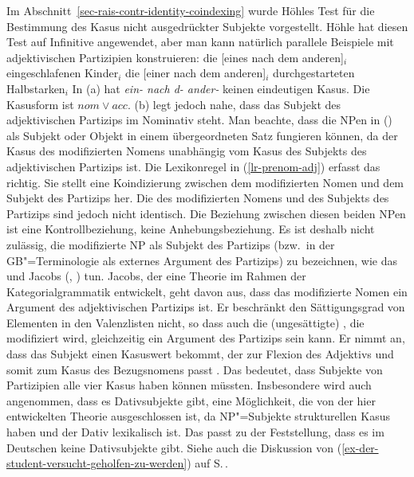 {Im Abschnitt~\ref{sec-rais-contr-identity-coindexing} wurde Höhles Test \citeyearpar[Kapitel~6]{Hoehle83a}
für die Bestimmung des Kasus nicht ausgedrückter Subjekte vorgestellt. Höhle hat diesen Test auf
Infinitive angewendet, aber man kann natürlich parallele Beispiele mit adjektivischen Partizipien konstruieren:
\eal
\label{ex-subj-case-adjectival-part}
\ex
die [eines         nach  dem           anderen]$_i$ eingeschlafenen Kinder$_i$
\ex
die [einer         nach  dem           anderen]$_i$ durchgestarteten Halbstarken$_i$
\zl
In (a) hat \emph{ein- nach d- ander-} keinen eindeutigen Kasus. Die
Kasusform ist $nom \vee acc$. (b) legt jedoch nahe, dass das Subjekt des adjektivischen
Partizips im Nominativ steht. Man beachte, dass die NPen in () als Subjekt oder Objekt in
einem übergeordneten Satz fungieren können, da der Kasus des modifizierten Nomens unabhängig vom
Kasus des Subjekts des adjektivischen Partizips ist. Die Lexikonregel in (\ref{lr-prenom-adj})
erfasst das richtig. Sie stellt eine Koindizierung zwischen dem modifizierten Nomen und
dem Subjekt des Partizips her. Die \synsemwe des modifizierten Nomens und des Subjekts des Partizips
sind jedoch nicht identisch. Die Beziehung zwischen diesen beiden NPen ist eine Kontrollbeziehung,
keine Anhebungsbeziehung.
Es ist deshalb nicht zulässig, die modifizierte NP als Subjekt des Partizips (bzw.\ in der
GB"=Terminologie als externes Argument des Partizips) zu bezeichnen, wie das \zb
\citet[]{LR86a} und Jacobs
(\citeyear[]{Jacobs91a}, \citeyear[]{Jacobs92a-u}) tun. Jacobs, der eine Theorie im Rahmen der
Kategorialgrammatik entwickelt, geht davon aus, dass das modifizierte
Nomen ein Argument des adjektivischen Partizips ist. Er beschränkt den Sättigungsgrad von Elementen
in den Valenzlisten nicht, so dass auch die (ungesättigte) \nbar, die modifiziert wird, gleichzeitig
ein Argument des Partizips sein kann. Er nimmt an, dass das Subjekt einen Kasuswert bekommt, der zur 
Flexion des Adjektivs und somit zum Kasus des Bezugsnomens passt \citep[]{Jacobs91a}. %
Das bedeutet, dass Subjekte von Partizipien alle vier Kasus haben können müssten. Insbesondere wird auch angenommen, dass es
Dativsubjekte gibt, eine Möglichkeit, die von der hier entwickelten Theorie ausgeschlossen ist, da
NP"=Subjekte strukturellen Kasus haben und der Dativ lexikalisch ist. Das passt zu der Feststellung,
dass es im Deutschen keine Dativsubjekte gibt. Siehe auch die Diskussion von
(\ref{ex-der-student-versucht-geholfen-zu-werden}) auf
S.\,\pageref{ex-der-student-versucht-geholfen-zu-werden}.%
%


}
